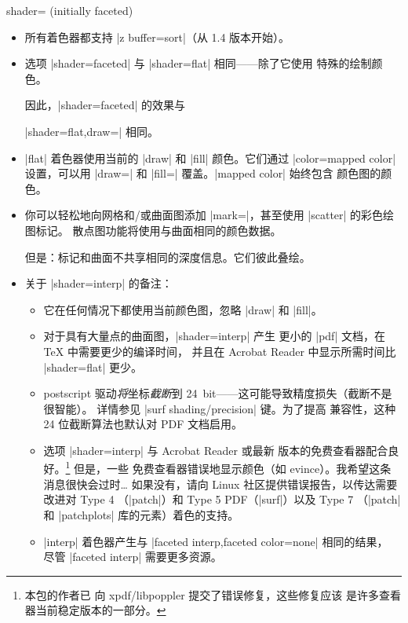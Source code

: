 {\begin{pgfplotskey}{shader= (initially faceted)%
}
    \begin{itemize}
        \item 所有着色器都支持 |z buffer=sort|（从 1.4 版本开始）。
        \item 选项 |shader=faceted| 与 |shader=flat| 相同——除了它使用
            特殊的绘制颜色。

            因此，|shader=faceted| 的效果与

            |shader=flat,draw=|
            相同。
        \item |flat| 着色器使用当前的 |draw| 和 |fill| 颜色。它们通过
            |color=mapped color| 设置，可以用 |draw=|
            和 |fill=| 覆盖。|mapped color| 始终包含
            颜色图的颜色。
        \item 你可以轻松地向网格和/或曲面图添加
            |mark=|，甚至使用 |scatter| 的彩色绘图标记。
            散点图功能将使用与曲面相同的颜色数据。

            但是：标记和曲面不共享相同的深度信息。它们彼此叠绘。
        \item 关于 |shader=interp| 的备注：
            \begin{itemize}
                \item 它在任何情况下都使用当前颜色图，忽略
                    |draw| 和 |fill|。
                \item 对于具有大量点的曲面图，|shader=interp| 产生
                    更小的 |pdf| 文档，在 \TeX{} 中需要更少的编译时间，
                    并且在 Acrobat Reader 中显示所需时间比
                    |shader=flat| 更少。
                \item postscript 驱动\emph{将}坐标\emph{截断}到
                    24~bit——这可能导致精度损失（截断不是很智能）。
                    详情参见 |surf shading/precision| 键。为了提高
                    兼容性，这种 24 位截断算法也默认对 PDF 文档启用。
                \item 选项 |shader=interp| 与 Acrobat Reader 或最新
                    版本的免费查看器配合良好。\footnote{本包的作者已
                    向 xpdf/libpoppler 提交了错误修复，这些修复应该
                    是许多查看器当前稳定版本的一部分。} 但是，一些
                    免费查看器错误地显示颜色（如 evince）。我希望这条
                    消息很快会过时\ldots{} 如果没有，请向 Linux
                    社区提供错误报告，以传达需要改进对 Type 4
                    （|patch|）和 Type 5 PDF（|surf|）以及 Type 7
                    （|patch| 和 |patchplots| 库的元素）着色的支持。
                \item |interp| 着色器产生与
                    |faceted interp,faceted color=none| 相同的结果，
                    尽管 |faceted interp| 需要更多资源。
            \end{itemize}
    \end{itemize}


\end{pgfplotskey}}
